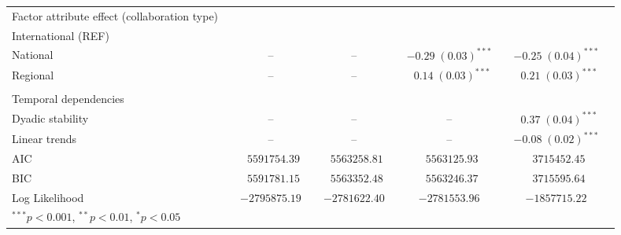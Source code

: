 \begin{table}
\begin{center}
\begin{tabular}{@{}lcclclclcl@{}}
Factor attribute effect (collaboration type) & & & & & & & & \\
\hspace{10pt}International (REF) & & & & & & & & \\
\hspace{10pt}National &  &         --            &  &         --            &  & $-0.29 \; (0.03)^{***}$ &  & $-0.25 \; (0.04)^{***}$ \\
\hspace{10pt}Regional &  &         --            &  &         --            &  & $\hspace{6pt}0.14 \; (0.03)^{***}$  &  & $\hspace{6pt}0.21 \; (0.03)^{***}$  \\\\
Temporal dependencies & & & & & & & & \\
\hspace{10pt}Dyadic stability                 &  &         --            &  &          --           &  &    --                   &  & $\hspace{6pt}0.37 \; (0.04)^{***}$  \\
\hspace{10pt}Linear trends               &  &          --           &  &         --            &  &       --                &  & $-0.08 \; (0.02)^{***}$ \\
\midrule
AIC        &  & $\hspace{6pt}5591754.39$  &  & $\hspace{6pt}5563258.81$ &  & $\hspace{6pt}5563125.93$            &  & $\hspace{6pt}3715452.45$            \\
BIC              &  & $\hspace{6pt}5591781.15$            &  & $\hspace{6pt}5563352.48$            &  & $\hspace{6pt}5563246.37$            &  & $\hspace{6pt}3715595.64$            \\
Log Likelihood                 &  & $-2795875.19$           &  & $-2781622.40$           &  & $-2781553.96$           &  & $-1857715.22$           \\
\bottomrule
\multicolumn{5}{l}{\scriptsize{$^{***}p<0.001$, $^{**}p<0.01$, $^*p<0.05$}}
\end{tabular}
\end{center}
\end{table}